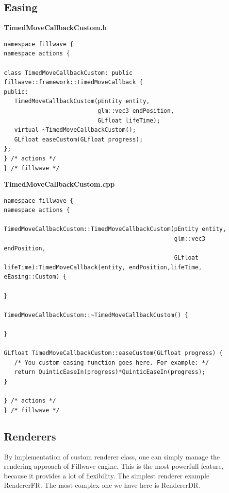 \documentclass{article}
\begin{document}
\subsection{Easing}\label{sec:Custom easing}
\textbf{TimedMoveCallbackCustom.h}
\begin{lstlisting}
namespace fillwave {
namespace actions {

class TimedMoveCallbackCustom: public fillwave::framework::TimedMoveCallback {
public:
   TimedMoveCallbackCustom(pEntity entity,
                           glm::vec3 endPosition,
                           GLfloat lifeTime);
   virtual ~TimedMoveCallbackCustom();
   GLfloat easeCustom(GLfloat progress);
};
} /* actions */
} /* fillwave */
\end{lstlisting}
\textbf{TimedMoveCallbackCustom.cpp}
\begin{lstlisting}
namespace fillwave {
namespace actions {

TimedMoveCallbackCustom::TimedMoveCallbackCustom(pEntity entity,
                                                 glm::vec3 endPosition,
                                                 GLfloat lifeTime):TimedMoveCallback(entity, endPosition,lifeTime, eEasing::Custom) {

}

TimedMoveCallbackCustom::~TimedMoveCallbackCustom() {

}

GLfloat TimedMoveCallbackCustom::easeCustom(GLfloat progress) {
   /* You custom easing function goes here. For example: */
   return QuinticEaseIn(progress)*QuinticEaseIn(progress);
}

} /* actions */
} /* fillwave */
\end{lstlisting}

\subsection{Renderers}\label{sec:Custom renderers}
\indent By implementation of custom renderer class, one can simply manage the rendering approach of Fillwave engine. This is the most powerfull feature, because it provides a lot of flexibility. The simplest renderer example RendererFR. The most complex one we have here is RendererDR. 
\end{document}
